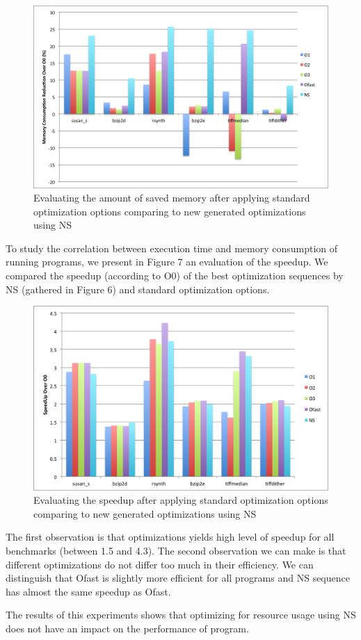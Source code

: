 \begin{figure}[b!]
	\centering
	\includegraphics[width=1.\linewidth]{Ressources/infra_novelty_stat3.png}
	\caption{Evaluating the amount of saved memory after applying standard optimization options comparing to new generated optimizations using NS}
\end{figure}
To study the correlation between execution time and memory consumption of running programs, we present in Figure 7 an evaluation of the speedup. We compared the speedup (according to O0) of the best optimization sequences by NS (gathered in Figure 6) and standard optimization options. 
\begin{figure}[t!]
	\centering
	\includegraphics[width=1.\linewidth]{Ressources/infra_novelty_stat2.png}
	\caption{Evaluating the speedup after applying standard optimization options comparing to new generated optimizations using NS}
\end{figure}
The first observation is that optimizations yields high level of speedup for all benchmarks (between 1.5 and 4.3).
The second observation we can make is that different optimizations do not differ too much in their
efficiency. We can distinguish that Ofast is slightly more efficient for all programs and NS sequence has almost the same speedup as Ofast. 

The results of this experiments shows that optimizing for resource usage using NS does not have an impact on the performance of program.

